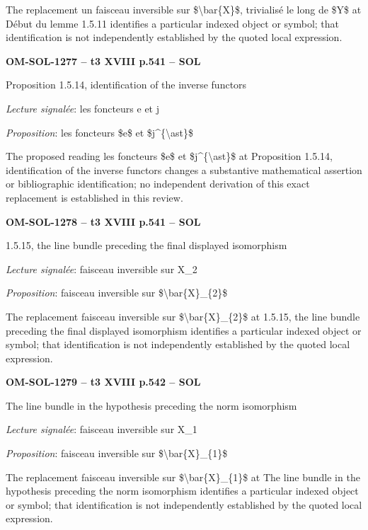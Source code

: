 The replacement un faisceau inversible sur \$\textbackslash{}bar\{X\}\$, trivialisé le long de \$Y\$ at Début du lemme 1.5.11 identifies a particular indexed object or symbol; that identification is not independently established by the quoted local expression.\par
\par\noindent\textbf{OM-SOL-1277 -- t3 XVIII p.541 -- SOL}\par
Proposition 1.5.14, identification of the inverse functors\par
\emph{Lecture signalée}: les foncteurs e et j\par
\emph{Proposition}: les foncteurs \$e\$ et \$j\textasciicircum{}\{\textbackslash{}ast\}\$\par
The proposed reading les foncteurs \$e\$ et \$j\textasciicircum{}\{\textbackslash{}ast\}\$ at Proposition 1.5.14, identification of the inverse functors changes a substantive mathematical assertion or bibliographic identification; no independent derivation of this exact replacement is established in this review.\par
\par\noindent\textbf{OM-SOL-1278 -- t3 XVIII p.541 -- SOL}\par
1.5.15, the line bundle preceding the final displayed isomorphism\par
\emph{Lecture signalée}: faisceau inversible sur X\_2\par
\emph{Proposition}: faisceau inversible sur \$\textbackslash{}bar\{X\}\_\{2\}\$\par
The replacement faisceau inversible sur \$\textbackslash{}bar\{X\}\_\{2\}\$ at 1.5.15, the line bundle preceding the final displayed isomorphism identifies a particular indexed object or symbol; that identification is not independently established by the quoted local expression.\par
\par\noindent\textbf{OM-SOL-1279 -- t3 XVIII p.542 -- SOL}\par
The line bundle in the hypothesis preceding the norm isomorphism\par
\emph{Lecture signalée}: faisceau inversible sur X\_1\par
\emph{Proposition}: faisceau inversible sur \$\textbackslash{}bar\{X\}\_\{1\}\$\par
The replacement faisceau inversible sur \$\textbackslash{}bar\{X\}\_\{1\}\$ at The line bundle in the hypothesis preceding the norm isomorphism identifies a particular indexed object or symbol; that identification is not independently established by the quoted local expression.\par

